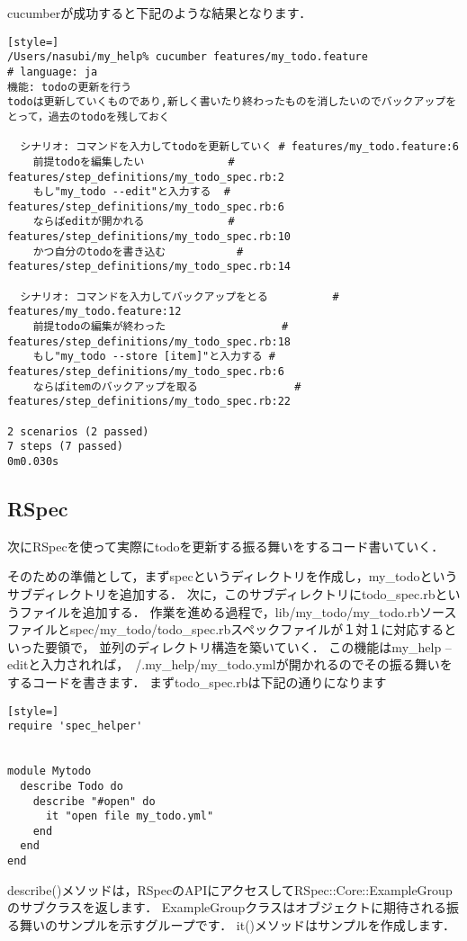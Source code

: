 cucumberが成功すると下記のような結果となります．
\begin{lstlisting}[style=]
/Users/nasubi/my_help% cucumber features/my_todo.feature 
# language: ja
機能: todoの更新を行う
todoは更新していくものであり,新しく書いたり終わったものを消したいのでバックアップをとって，過去のtodoを残しておく

  シナリオ: コマンドを入力してtodoを更新していく # features/my_todo.feature:6
    前提todoを編集したい             # features/step_definitions/my_todo_spec.rb:2
    もし"my_todo --edit"と入力する  # features/step_definitions/my_todo_spec.rb:6
    ならばeditが開かれる             # features/step_definitions/my_todo_spec.rb:10
    かつ自分のtodoを書き込む           # features/step_definitions/my_todo_spec.rb:14

  シナリオ: コマンドを入力してバックアップをとる          # features/my_todo.feature:12
    前提todoの編集が終わった                  # features/step_definitions/my_todo_spec.rb:18
    もし"my_todo --store [item]"と入力する # features/step_definitions/my_todo_spec.rb:6
    ならばitemのバックアップを取る               # features/step_definitions/my_todo_spec.rb:22

2 scenarios (2 passed)
7 steps (7 passed)
0m0.030s

\end{lstlisting}
\subsection{RSpec}
次にRSpecを使って実際にtodoを更新する振る舞いをするコード書いていく．

そのための準備として，まずspecというディレクトリを作成し，my\_todoというサブディレクトリを追加する．
次に，このサブディレクトリにtodo\_spec.rbというファイルを追加する．
作業を進める過程で，lib/my\_todo/my\_todo.rbソースファイルとspec/my\_todo/todo\_spec.rbスペックファイルが１対１に対応するといった要領で，
並列のディレクトリ構造を築いていく．
この機能はmy\_help --editと入力されれば，~/.my\_help/my\_todo.ymlが開かれるのでその振る舞いをするコードを書きます．
まずtodo\_spec.rbは下記の通りになります
\begin{lstlisting}[style=]
require 'spec_helper'


module Mytodo
  describe Todo do
    describe "#open" do
      it "open file my_todo.yml" 
    end
  end
end

\end{lstlisting}
describe()メソッドは，RSpecのAPIにアクセスしてRSpec::Core::ExampleGroupのサブクラスを返します．
ExampleGroupクラスはオブジェクトに期待される振る舞いのサンプルを示すグループです．
it()メソッドはサンプルを作成します．

